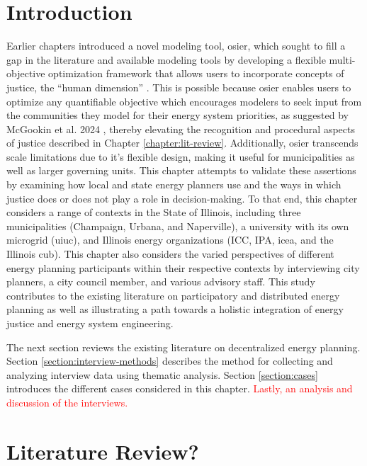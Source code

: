 \section{Introduction}

Earlier chapters introduced a novel modeling tool, \ac{osier}, which sought to
fill a gap in the literature and available modeling tools by developing a flexible
multi-objective optimization framework that allows users to incorporate concepts
of justice, the ``human dimension'' \cite{pfenninger_energy_2014}. This is
possible because \ac{osier} enables users to optimize any quantifiable objective
which encourages modelers to seek input from the communities they model for
their energy system priorities, as suggested by McGookin et al. 2024
\cite{mcgookin_advancing_2024}, thereby elevating the recognition and procedural
aspects of justice described in Chapter \ref{chapter:lit-review}. Additionally,
\ac{osier} transcends scale limitations due to it's flexible design, making it
useful for municipalities as well as larger governing units. This chapter
attempts to validate these assertions by examining how local and state energy
planners use  and the ways in which justice does or does not play a
role in decision-making. To that end, this chapter considers a range of contexts
in the State of Illinois, including three municipalities (Champaign, Urbana, and 
Naperville), a university with its own microgrid (\acf{uiuc}), and Illinois energy 
organizations (\acf{ICC}, \acf{IPA}, \acf{icea}, and the Illinois \acf{cub}). This
chapter also considers the varied perspectives of different energy planning participants
within their respective contexts by interviewing city planners,
a city council member, and various advisory staff. This study contributes to the existing 
literature on participatory and distributed energy planning as well as illustrating
a path towards a holistic integration of energy justice and energy system engineering.

The next section reviews the existing literature on decentralized energy planning. 
Section \ref{section:interview-methods} describes the method for collecting and analyzing
interview data using thematic analysis. Section \ref{section:cases} introduces the different
cases considered in this chapter. \textcolor{red}{Lastly, an analysis and discussion of the interviews.}


\section{Literature Review?}

